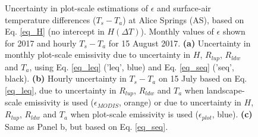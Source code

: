 \documentclass[fleqn,10pt]{wlscirep}
\begin{document}
{{\begin{figure}[h!]

\setlength{\belowcaptionskip}{-3ex}
\caption{Uncertainty in plot-scale estimations of $\epsilon$ and surface-air temperature differences ($T_{s} - T_{a}$) at Alice Springs (AS), based on Eq. \ref{eq_H} (no intercept in $H(\Delta T)$). Monthly values of $\epsilon$ shown for 2017 and hourly $T_{s} - T_{a}$ for 15 August 2017. \textbf{(a)} Uncertainty in monthly plot-scale emissivity due to uncertainty in $H$, $R_{lup}$, $R_{ldw}$ and $T_{a}$, using Eq. \ref{eq_leq} ('leq', blue)  and Eq. \ref{eq_seq} ('seq', black). \textbf{(b)} Hourly uncertainty in $T_{s} - T_{a}$ on 15 July based on Eq. \ref{eq_leq}, due to uncertainty in $R_{lup}$, $R_{ldw}$ and $T_{a}$ when landscape-scale emissivity is used ($\epsilon_{MODIS}$, orange) or due to uncertainty in $H$, $R_{lup}$, $R_{ldw}$ and $T_{a}$ when plot-scale emissivity is used ($\epsilon_{plot}$, blue). \textbf{(c)} Same as Panel b, but based on Eq. \ref{eq_seq}. 
}
\label{fig:eps_unc1}
\end{figure}

}}
\end{document}
